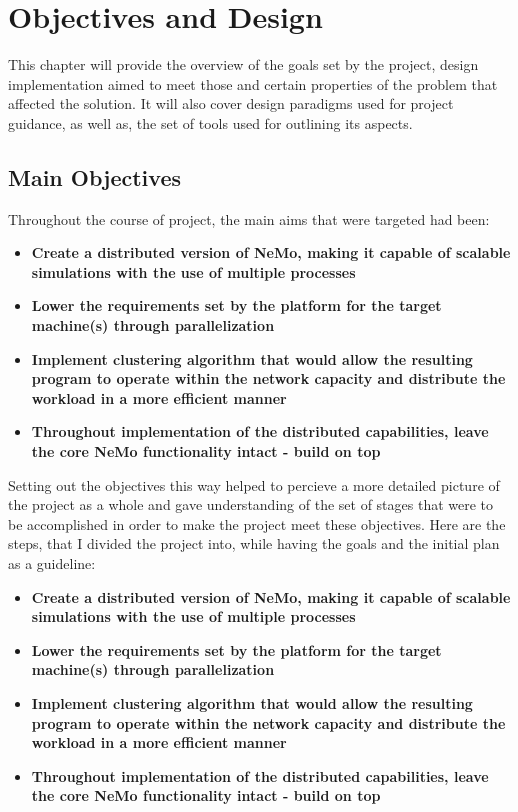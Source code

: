 \chapter{Objectives and Design}

This chapter will provide the overview of the goals set by the project, design implementation aimed to meet those and certain properties of the problem that affected the solution.
It will also cover design paradigms used for project guidance, as well as, the set of tools used for outlining its aspects.

\section{Main Objectives}

Throughout the course of project, the main aims that were targeted had been:

\begin{itemize}
\item {\textbf{Create a distributed version of NeMo, making it capable of scalable simulations with the use of multiple processes}}
\item {\textbf{Lower the requirements set by the platform for the target machine(s) through parallelization}}
\item {\textbf{Implement clustering algorithm that would allow the resulting program to operate within the network capacity and distribute the workload in a more efficient manner}}
\item {\textbf{Throughout implementation of the distributed capabilities, leave the core NeMo functionality intact - build on top}}
\end{itemize}

Setting out the objectives this way helped to percieve a more detailed picture of the project as a whole and gave understanding of the set of stages that were to be accomplished in order to
make the project meet these objectives. Here are the steps, that I divided the project into, while having the goals and the initial plan as a guideline:

\begin{itemize}
\item {\textbf{Create a distributed version of NeMo, making it capable of scalable simulations with the use of multiple processes}}
\item {\textbf{Lower the requirements set by the platform for the target machine(s) through parallelization}}
\item {\textbf{Implement clustering algorithm that would allow the resulting program to operate within the network capacity and distribute the workload in a more efficient manner}}
\item {\textbf{Throughout implementation of the distributed capabilities, leave the core NeMo functionality intact - build on top}}
\end{itemize}


